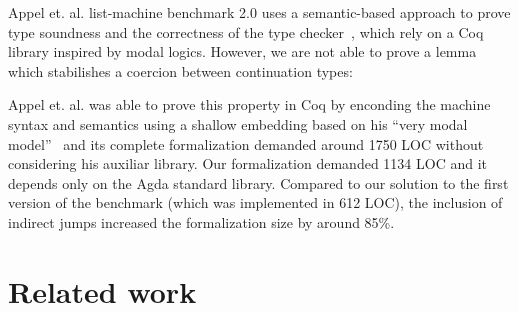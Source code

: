 \documentclass[review]{elsarticle}
\theoremstyle{definition}
\def\resethooks{%
  \global\let\SaveRestoreHook\empty
  \global\let\ColumnHook\empty}
\let\hspre\empty
\let\hspost\empty
\newcommand{\D}[1]{\blue{\mathsf{#1}}}
\newcommand{\V}[1]{\purple{\mathit{#1}}}
\begin{document}
Appel et. al. list-machine benchmark 2.0 uses a semantic-based approach to prove type soundness and the
correctness of the type checker~\cite{AppelMRV07}, which rely on a Coq library inspired by modal logics.
However, we are not able to prove a lemma which stabilishes a coercion between continuation types:
\resethooks
Appel et. al. was able to prove this property in Coq by enconding the machine syntax and semantics using
a shallow embedding based on his ``very modal model''~\cite{Appel07} and its complete formalization
demanded around 1750 LOC without considering his auxiliar library.
Our formalization demanded 1134 LOC and it depends only on the Agda standard library.
Compared to our solution to the first version of the benchmark (which was implemented in 612 LOC),
the inclusion of indirect jumps increased the formalization size by around 85\%.

\section{Related work}\label{sec:related}
\end{document}

